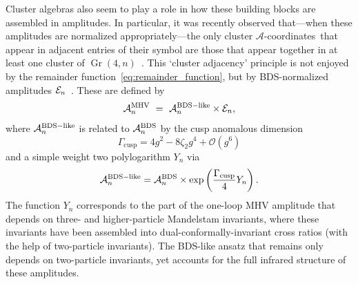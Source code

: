 \documentclass[11pt]{article}
\DeclareMathOperator{\Gr}{Gr}
\def\acoords{$\mathcal{A}$-coordinates}
\begin{document}
Cluster algebras also seem to play a role in how these building blocks are assembled in amplitudes. In particular, it was recently observed that---when these amplitudes are normalized appropriately---the only cluster \acoords\ that appear in adjacent entries of their symbol are those that appear together in at least one cluster of $\Gr(4,n)$~\cite{Drummond:2017ssj}. This `cluster adjacency' principle is not enjoyed by the remainder function~\eqref{eq:remainder_function}, but by BDS-normalized amplitudes ${\cal E}_n$~\cite{Alday:2009dv,Yang:2010as,Caron-Huot:2016owq,Dixon:2016nkn}. These are defined by
\begin{equation} \label{eq:bds_like_normalized_amplitude}
\mathcal{A}_n^{\rm MHV}\ =\ \mathcal{A}_n^{\rm BDS-like}  \times  {\cal E}_n,
\end{equation}
where $\mathcal{A}_n^{\rm BDS-like}$ is related to $\mathcal{A}_n^{\rm BDS}$ by the cusp anomalous dimension~\cite{Beisert:2006ez} 
\begin{equation}
\Gamma_{\text{cusp}} = 4 g^2- 8 \zeta_2 g^4 + \mathcal{O}(g^6)
\end{equation}
and a simple weight two polylogarithm $Y_n$ via
\begin{equation} \label{eq:bds_like_ansatz}
\mathcal{A}_n^{\rm BDS-like} = \mathcal{A}_n^{\rm BDS} \times \exp\left( \frac{\Gamma_{\text{cusp}}}{4} Y_n \right).
\end{equation}
The function $Y_n$ corresponds to the part of the one-loop MHV amplitude that depends on three- and higher-particle Mandelstam invariants, where these invariants have been assembled into dual-conformally-invariant cross ratios (with the help of two-particle invariants). The BDS-like ansatz that remains only depends on two-particle invariants, yet accounts for the full infrared structure of these amplitudes. 
\end{document}
